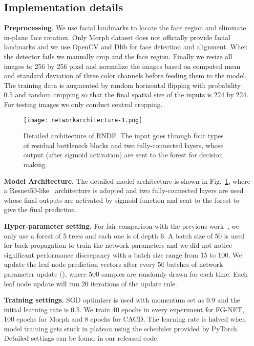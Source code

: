 \documentclass{bmvc2k}
\begin{document}
\subsection{Implementation details}
\textbf{Preprocessing}. We use facial landmarks to locate the face region and eliminate in-plane face rotation. Only Morph dataset does not officially provide facial landmarks and we use OpenCV and Dlib for face detection and alignment. When the detector fails we manually crop and the face region. Finally we resize all images to 256 by 256 pixel and normalize the images based on computed mean and standard deviation of three color channels before feeding them to the model. The training data is augmented by random horizontal flipping with probability 0.5 and random cropping so that the final spatial size of the inputs is 224 by 224. For testing images we only conduct central cropping.

\begin{figure}
	\centering
	
	\begin{center}
		\texttt{[image: networkarchitecture-1.png]}
	\end{center}
	
	\caption{Detailed architecture of RNDF. The input goes through four types of residual bottleneck blocks and two fully-connected layers, whose output (after sigmoid activation) are sent to the forest for decision making.} 
	\label{modelarc}
\end{figure}

\textbf{Model Architecture.} The detailed model architecture is shown in Fig.~\ref{modelarc}, where a Resnet50-like~\cite{resnet} architecture is adopted and two fully-connected layers are used whose final outputs are activated by sigmoid function and sent to the forest to give the final prediction. 

\textbf{Hyper-parameter setting.} For fair comparison with the previous work~\cite{DRFs}, we only use a forest of 5 trees and each one is of depth 6.  A batch size of 50 is used for back-propagation to train the network parameters and we did not notice significant performance discrepancy with a batch size range from 15 to 100. We update the leaf node prediction vectors after every 50 batches of network parameter update (), where 500 samples are randomly drawn for each time. Each leaf node update will run 20 iterations of the update rule.

\textbf{Training settings.} SGD optimizer is used with momentum set as 0.9 and the initial learning rate is 0.5. We train 40 epochs in every experiment for FG-NET, 100 epochs for Morph and 8 epochs for CACD. The learning rate is halved when model training gets stuck in plateau using the scheduler provided by PyTorch. Detailed settings can be found in our released code.
\end{document}
